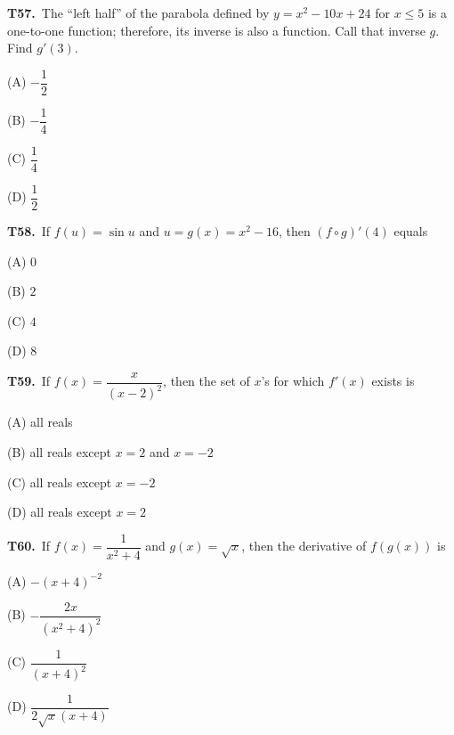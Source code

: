 \documentclass[11pt]{article}
\begin{document}
\bigskip\noindent\textbf{T57.}\ The ``left half'' of the parabola defined by $y = x^2-10x+24$ for $x \leq 5$ is a one-to-one function; therefore, its inverse is also a function. Call that inverse $g$. Find $g'(3)$.
\begin{list}{}{\setlength{\leftmargin}{3em}\setlength{\labelwidth}{2.5em}\setlength{\itemsep}{0pt}\setlength{\topsep}{2pt}}
\item[(A)] $-\dfrac{1}{2}$
\item[(B)] $-\dfrac{1}{4}$
\item[(C)] $\dfrac{1}{4}$
\item[(D)] $\dfrac{1}{2}$
\end{list}

\bigskip\noindent\textbf{T58.}\ If $f(u) = \sin u$ and $u = g(x) = x^2-16$, then $(f \circ g)'(4)$ equals
\begin{list}{}{\setlength{\leftmargin}{3em}\setlength{\labelwidth}{2.5em}\setlength{\itemsep}{0pt}\setlength{\topsep}{2pt}}
\item[(A)] $0$
\item[(B)] $2$
\item[(C)] $4$
\item[(D)] $8$
\end{list}

\bigskip\noindent\textbf{T59.}\ If $f(x) = \dfrac{x}{(x-2)^2}$, then the set of $x$'s for which $f'(x)$ exists is
\begin{list}{}{\setlength{\leftmargin}{3em}\setlength{\labelwidth}{2.5em}\setlength{\itemsep}{0pt}\setlength{\topsep}{2pt}}
\item[(A)] all reals
\item[(B)] all reals except $x=2$ and $x=-2$
\item[(C)] all reals except $x=-2$
\item[(D)] all reals except $x=2$
\end{list}

\bigskip\noindent\textbf{T60.}\ If $f(x) = \dfrac{1}{x^2+4}$ and $g(x) = \sqrt{x}$, then the derivative of $f(g(x))$ is
\begin{list}{}{\setlength{\leftmargin}{3em}\setlength{\labelwidth}{2.5em}\setlength{\itemsep}{0pt}\setlength{\topsep}{2pt}}
\item[(A)] $-(x+4)^{-2}$
\item[(B)] $-\dfrac{2x}{(x^2+4)^2}$
\item[(C)] $\dfrac{1}{(x+4)^2}$
\item[(D)] $\dfrac{1}{2\sqrt{x}(x+4)}$
\end{list}
\end{document}
